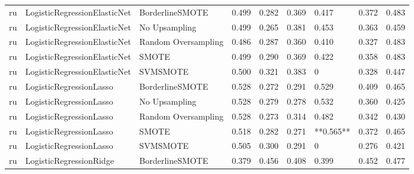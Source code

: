 \begin{tabular}{lllllllll}
      ru & LogisticRegressionElasticNet &     BorderlineSMOTE & 0.499 &                     0.282 &                 0.369 &                  0.417 &                                   0.372 &     0.483 \\
      ru & LogisticRegressionElasticNet &       No Upsampling & 0.499 &                     0.265 &                 0.381 &                  0.453 &                                   0.363 &     0.459 \\
      ru & LogisticRegressionElasticNet & Random Oversampling & 0.486 &                     0.287 &                 0.360 &                  0.410 &                                   0.327 &     0.483 \\
      ru & LogisticRegressionElasticNet &               SMOTE & 0.499 &                     0.290 &                 0.369 &                  0.422 &                                   0.358 &     0.483 \\
      ru & LogisticRegressionElasticNet &            SVMSMOTE & 0.500 &                     0.321 &                 0.383 &                      0 &                                   0.328 &     0.447 \\
      ru &      LogisticRegressionLasso &     BorderlineSMOTE & 0.528 &                     0.272 &                 0.291 &                  0.529 &                                   0.409 &     0.465 \\
      ru &      LogisticRegressionLasso &       No Upsampling & 0.528 &                     0.279 &                 0.278 &                  0.532 &                                   0.360 &     0.425 \\
      ru &      LogisticRegressionLasso & Random Oversampling & 0.528 &                     0.273 &                 0.314 &                  0.482 &                                   0.342 &     0.430 \\
      ru &      LogisticRegressionLasso &               SMOTE & 0.518 &                     0.282 &                 0.271 &              **0.565** &                                   0.372 &     0.465 \\
      ru &      LogisticRegressionLasso &            SVMSMOTE & 0.505 &                     0.300 &                 0.291 &                      0 &                                   0.276 &     0.421 \\
      ru &      LogisticRegressionRidge &     BorderlineSMOTE & 0.379 &                     0.456 &                 0.408 &                  0.399 &                                   0.452 &     0.477 \\

\end{tabular}
